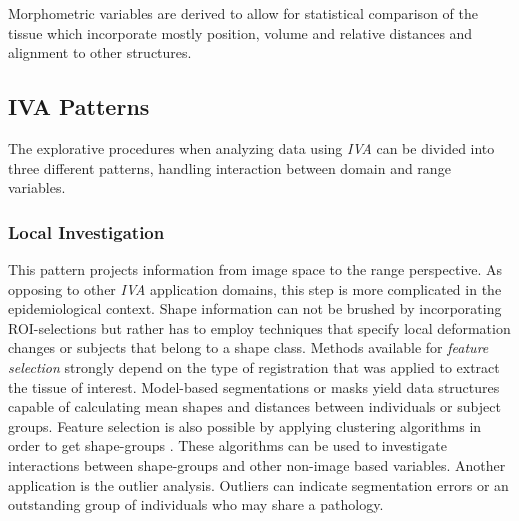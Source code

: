 \documentclass[journal]{style/vgtc} 			          %
\begin{document}
Morphometric variables are derived to allow for statistical comparison of the tissue which incorporate mostly position, volume and relative distances and alignment to other structures.
% 

\subsection{IVA Patterns}

The explorative procedures when analyzing data using \emph{IVA} can be divided into three different patterns, handling interaction between domain and range variables.

\subsubsection{Local Investigation}
This pattern projects information from image space to the range perspective.
%
As opposing to other \emph{IVA} application domains, this step is more complicated in the epidemiological context.
%
Shape information can not be brushed by incorporating ROI-selections but rather has to employ techniques that specify local deformation changes \cite{Hermann2014} or subjects that belong to a shape class.
%
Methods available for \emph{feature selection} strongly depend on the type of registration that was applied to extract the tissue of interest.
%
Model-based segmentations or masks yield data structures capable of calculating mean shapes and distances between individuals or subject groups.
%
Feature selection is also possible by applying clustering algorithms in order to get shape-groups \cite{Klemm2013VMV}.
%
These algorithms can be used to investigate interactions between shape-groups and other non-image based variables.
%
Another application is the outlier analysis.
%
Outliers can indicate segmentation errors or an outstanding group of individuals who may share a pathology.

\end{document}

